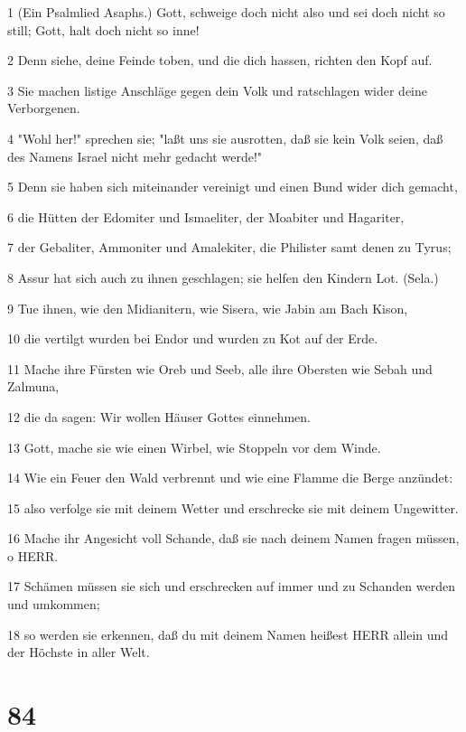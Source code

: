 \par 1 (Ein Psalmlied Asaphs.) Gott, schweige doch nicht also und sei doch nicht so still; Gott, halt doch nicht so inne!
\par 2 Denn siehe, deine Feinde toben, und die dich hassen, richten den Kopf auf.
\par 3 Sie machen listige Anschläge gegen dein Volk und ratschlagen wider deine Verborgenen.
\par 4 "Wohl her!" sprechen sie; "laßt uns sie ausrotten, daß sie kein Volk seien, daß des Namens Israel nicht mehr gedacht werde!"
\par 5 Denn sie haben sich miteinander vereinigt und einen Bund wider dich gemacht,
\par 6 die Hütten der Edomiter und Ismaeliter, der Moabiter und Hagariter,
\par 7 der Gebaliter, Ammoniter und Amalekiter, die Philister samt denen zu Tyrus;
\par 8 Assur hat sich auch zu ihnen geschlagen; sie helfen den Kindern Lot. (Sela.)
\par 9 Tue ihnen, wie den Midianitern, wie Sisera, wie Jabin am Bach Kison,
\par 10 die vertilgt wurden bei Endor und wurden zu Kot auf der Erde.
\par 11 Mache ihre Fürsten wie Oreb und Seeb, alle ihre Obersten wie Sebah und Zalmuna,
\par 12 die da sagen: Wir wollen Häuser Gottes einnehmen.
\par 13 Gott, mache sie wie einen Wirbel, wie Stoppeln vor dem Winde.
\par 14 Wie ein Feuer den Wald verbrennt und wie eine Flamme die Berge anzündet:
\par 15 also verfolge sie mit deinem Wetter und erschrecke sie mit deinem Ungewitter.
\par 16 Mache ihr Angesicht voll Schande, daß sie nach deinem Namen fragen müssen, o HERR.
\par 17 Schämen müssen sie sich und erschrecken auf immer und zu Schanden werden und umkommen;
\par 18 so werden sie erkennen, daß du mit deinem Namen heißest HERR allein und der Höchste in aller Welt.

\chapter{84}

